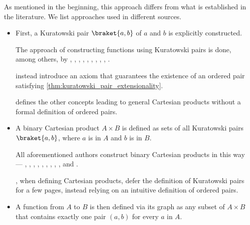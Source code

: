 \begin{remark}
  As mentioned in the beginning, this approach differs from what is established in the literature. We list approaches used in different sources.
  \begin{itemize}
    \item First, a Kuratowski pair \( \braket{ a, b } \) of \( a \) and \( b \) is explicitly constructed.

    The approach of constructing functions using Kuratowski pairs is done, among others, by
    ,
    ,
    ,
    ,
    ,
    ,
    ,
    ,
    ,
    .

     instead introduce an axiom that guarantees the existence of an ordered pair satisfying \cref{thm:kuratowski_pair_extensionality}.

     defines the other concepts leading to general Cartesian products without a formal definition of ordered pairs.

    \item A binary Cartesian product \( A \times B \) is defined as sets of all Kuratowski pairs \( \braket{ a, b } \), where \( a \) is in \( A \) and \( b \) is in \( B \).

    All aforementioned authors construct binary Cartesian products in this way ---
    ,
    ,
    ,
    ,
    ,
    ,
    ,
    ,
    ,
     and
    .

    , when defining Cartesian products, defer the definition of Kuratowski pairs for a few pages, instead relying on an intuitive definition of ordered pairs.

    \item A function from \( A \) to \( B \) is then defined via its graph as any subset of \( A \times B \) that contains exactly one pair \( (a, b) \) for every \( a \) in \( A \).


\end{itemize}
\end{remark}
